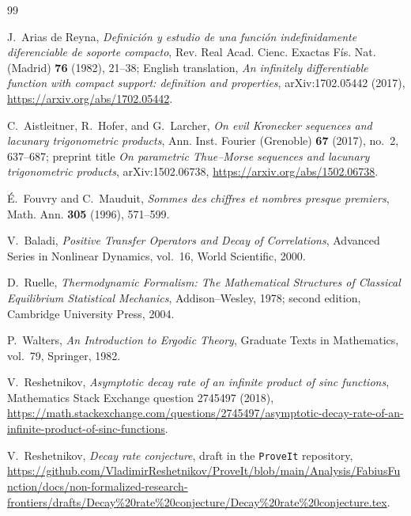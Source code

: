 \documentclass[11pt,oneside]{article}
\theoremstyle{definition}
\theoremstyle{remark}
\begin{document}
\begin{thebibliography}{99}

J.~Arias de Reyna,
\emph{Definici\'on y estudio de una funci\'on indefinidamente diferenciable de soporte compacto},
Rev. Real Acad. Cienc. Exactas F\'is. Nat. (Madrid) \textbf{76} (1982), 21--38;
English translation, \emph{An infinitely differentiable function with compact support:
definition and properties}, arXiv:1702.05442 (2017),
\url{https://arxiv.org/abs/1702.05442}.

C.~Aistleitner, R.~Hofer, and G.~Larcher,
\emph{On evil Kronecker sequences and lacunary trigonometric products},
Ann. Inst. Fourier (Grenoble) \textbf{67} (2017), no.~2, 637--687;
preprint title \emph{On parametric Thue--Morse sequences and lacunary trigonometric products},
arXiv:1502.06738,
\url{https://arxiv.org/abs/1502.06738}.

\'E.~Fouvry and C.~Mauduit,
\emph{Sommes des chiffres et nombres presque premiers},
Math. Ann. \textbf{305} (1996), 571--599.

V.~Baladi,
\emph{Positive Transfer Operators and Decay of Correlations},
Advanced Series in Nonlinear Dynamics, vol.~16, World Scientific, 2000.

D.~Ruelle,
\emph{Thermodynamic Formalism: The Mathematical Structures of Classical Equilibrium
Statistical Mechanics},
Addison--Wesley, 1978; second edition, Cambridge University Press, 2004.

P.~Walters,
\emph{An Introduction to Ergodic Theory},
Graduate Texts in Mathematics, vol.~79, Springer, 1982.

V.~Reshetnikov,
\emph{Asymptotic decay rate of an infinite product of sinc functions},
Mathematics Stack Exchange question 2745497 (2018),
\url{https://math.stackexchange.com/questions/2745497/asymptotic-decay-rate-of-an-infinite-product-of-sinc-functions}.

V.~Reshetnikov,
\emph{Decay rate conjecture}, draft in the \texttt{ProveIt} repository,
\url{https://github.com/VladimirReshetnikov/ProveIt/blob/main/Analysis/FabiusFunction/docs/non-formalized-research-frontiers/drafts/Decay%20rate%20conjecture/Decay%20rate%20conjecture.tex}.

\end{thebibliography}
\end{document}

